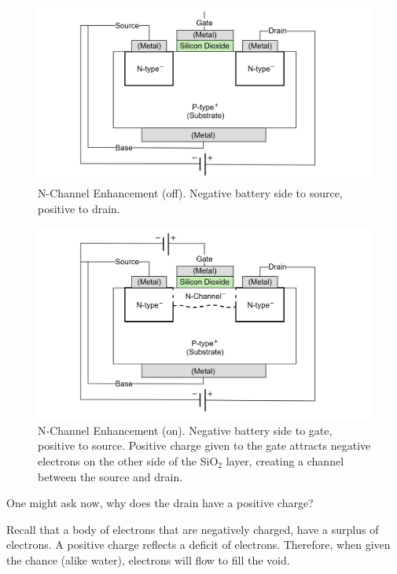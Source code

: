\vspace{-1em}
\begin{figure}[ht!]
  \centering
  \includegraphics[width=.91\textwidth]{Sections/circuits/mosfet.png}
  \caption{N-Channel Enhancement (off). Negative battery side to source, positive to drain.}
  \label{fig:mosfet}
\end{figure}

\newpage

\begin{figure}[ht!]
  \centering
  \includegraphics[width=.91\textwidth]{Sections/circuits/mosfet-on.png}
  \caption{N-Channel Enhancement (on). Negative battery side to gate, positive to source.
  Positive charge given to the gate attracts negative electrons on the other side of the 
  SiO$_2$ layer, creating a channel between the source and drain.}
  \label{fig:mosfet-on}
\end{figure}
\noindent
One might ask now, why does the drain have a positive charge?
\begin{theo}

  \label{theo:flow_of_electrons}

  Recall that a body of electrons that are negatively charged, have a surplus of electrons.
  A positive charge reflects a deficit of electrons. Therefore, when given the chance
  (alike water), electrons will flow to fill the void.
\end{theo}

